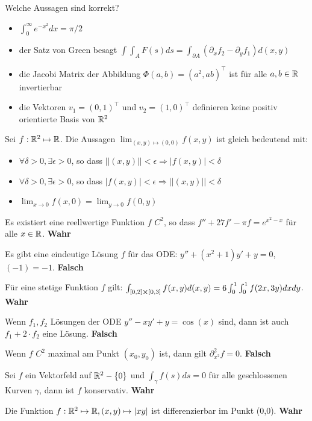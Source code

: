 \hrulefill

Welche Aussagen sind korrekt?
\begin{itemize}
    \item[$\square$] $\int_0^\infty e^{-x^2}dx = \pi / 2$
    \item[$\square$] der Satz von Green besagt $\int \int_A F(s)ds = \int_{\partial A}
    (\partial_x f_2 - \partial_y f_1)d(x,y)$
    \item[$\square$] die Jacobi Matrix der Abbildung $\Phi(a,b) = (a^2, ab)^\top$ ist für alle
    $a,b \in \mathbb{R}$ invertierbar
    \item[\rlap{\raisebox{0.3ex}{\hspace{0.4ex}\tiny \ding{52}}}$\square$] die Vektoren $v_1 
    = (0, 1)^\top$ und $v_2 = (1, 0)^\top$ definieren keine positiv orientierte Basis von
    $\mathbb{R}^2$
\end{itemize}

\hrulefill

Sei $f: \mathbb{R}^2 \mapsto \mathbb{R}$. Die Aussagen $\lim_{(x,y) \mapsto (0,0)} f(x,y)$ ist
gleich bedeutend mit:
\begin{itemize}
    \item[\rlap{\raisebox{0.3ex}{\hspace{0.4ex}\tiny \ding{52}}}$\square$]
    $\forall \delta > 0, \exists \epsilon > 0$, so dass $||(x,y)||< \epsilon 
    \Rightarrow |f(x,y)| < \delta$
    \item[$\square$] $\forall \delta > 0, \exists \epsilon > 0$, so dass 
    $|f(x,y)|< \epsilon \Rightarrow ||(x,y)|| < \delta$
    \item[$\square$] $\lim_{x \to 0} f(x,0) = \lim_{y \to 0}f(0,y)$
\end{itemize}

\hrulefill

Es existiert eine reellwertige Funktion $f$ $C^2$, so dass 
$f'' + 27 f' - \pi f = e^{x^2 - x}$ für alle $x \in \mathbb{R}$. \textbf{Wahr}

\hrulefill

Es gibt eine eindeutige Lösung $f$ für das ODE: $y'' + (x^2 + 1)y' + y = 0$, 
$(-1) = -1$. \textbf{Falsch}

\hrulefill

Für eine stetige Funktion $f$ gilt: 
$\int_{[0, 2] \cross [0, 3]} f(x,y)d(x,y) = 6 \int_0^1 \int_0^1 f(2x, 3y)dxdy$.
\textbf{Wahr}

\hrulefill

Wenn $f_1, f_2$ Lösungen der ODE $y'' - xy' + y = \cos(x)$ sind, dann ist auch 
$f_1 + 2 \cdot f_2$ eine Lösung. \textbf{Falsch}

\hrulefill

Wenn $f$ $C^2$ maximal am Punkt $(x_0, y_0)$ ist, dann gilt $\partial^2_{x^2}f = 0.$
\textbf{Falsch}

\hrulefill

Sei $f$ ein Vektorfeld auf $\mathbb{R}^2 - \{0\}$ und $\int_\gamma f(s)ds = 0$ für alle 
geschlossenen Kurven $\gamma$, dann ist $f$ konservativ. \textbf{Wahr}

\hrulefill

Die Funktion $f : \mathbb{R}^2 \mapsto \mathbb{R}, (x,y) \mapsto |xy|$ ist differenzierbar im Punkt (0,0).
\textbf{Wahr}

